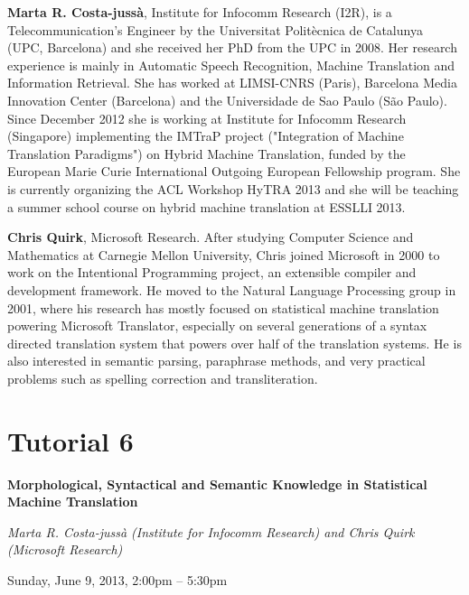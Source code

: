 \begin{bio}
\setlength{\parskip}{1ex}

\noindent
{\bfseries Marta R. Costa-jussà}, Institute for Infocomm Research (I2R), is a Telecommunication's Engineer by the Universitat Politècnica de Catalunya (UPC, Barcelona) and she received her PhD from the UPC in 2008. Her research experience is mainly in Automatic Speech Recognition, Machine Translation and Information Retrieval. She has worked at LIMSI-CNRS (Paris), Barcelona Media Innovation Center (Barcelona) and the Universidade de Sao Paulo (São Paulo). Since December 2012 she is working at Institute for Infocomm Research (Singapore) implementing the IMTraP project ("Integration of Machine Translation Paradigms") on Hybrid Machine Translation, funded by the European Marie Curie International Outgoing European Fellowship program. She is currently organizing the ACL Workshop HyTRA 2013 and she will be teaching a summer school course on hybrid machine translation at ESSLLI 2013.

\noindent
{\bfseries Chris Quirk}, Microsoft Research. After studying Computer Science and Mathematics at Carnegie Mellon University, Chris joined Microsoft in 2000 to work on the Intentional Programming project, an extensible compiler and development framework. He moved to the Natural Language Processing group in 2001, where his research has mostly focused on statistical machine translation powering Microsoft Translator, especially on several generations of a syntax directed translation system that powers over half of the translation systems. He is also interested in semantic parsing, paraphrase methods, and very practical problems such as spelling correction and transliteration.
\end{bio}

\section%
    [\textbf{T6:} Morphological, Syntactical and Semantic Knowledge in Statistical Machine Translation (M.~R. Costa-juss\`{a} and C. Quirk)]
    {Tutorial 6}
\label{TutF}
\begin{center}
\begin{Large}
\bfseries Morphological, Syntactical and Semantic Knowledge in Statistical Machine Translation\\ \vspace{2em}\par
\end{Large}

{\itshape Marta R. Costa-juss\`{a} (Institute for Infocomm Research) and Chris Quirk (Microsoft Research)}\vspace{1em}\par
Sunday, June 9, 2013, 2:00pm -- 5:30pm \vspace{1em}\\
\TutLocF
\end{center}

